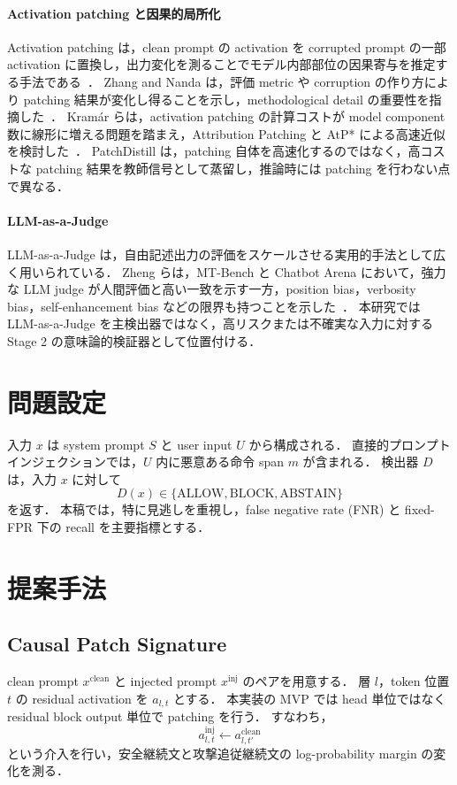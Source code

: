 \documentclass[11pt,a4paper]{ltjsarticle}
\begin{document}
\paragraph{Activation patching と因果的局所化}
Activation patching は，clean prompt の activation を corrupted prompt の一部 activation に置換し，出力変化を測ることでモデル内部部位の因果寄与を推定する手法である~\cite{zhang2024activationpatching}．
Zhang and Nanda は，評価 metric や corruption の作り方により patching 結果が変化し得ることを示し，methodological detail の重要性を指摘した~\cite{zhang2024activationpatching}．
Kramár らは，activation patching の計算コストが model component 数に線形に増える問題を踏まえ，Attribution Patching と AtP* による高速近似を検討した~\cite{kramar2024atpstar}．
PatchDistill は，patching 自体を高速化するのではなく，高コストな patching 結果を教師信号として蒸留し，推論時には patching を行わない点で異なる．

\paragraph{LLM-as-a-Judge}
LLM-as-a-Judge は，自由記述出力の評価をスケールさせる実用的手法として広く用いられている．
Zheng らは，MT-Bench と Chatbot Arena において，強力な LLM judge が人間評価と高い一致を示す一方，position bias，verbosity bias，self-enhancement bias などの限界も持つことを示した~\cite{zheng2023judging}．
本研究では LLM-as-a-Judge を主検出器ではなく，高リスクまたは不確実な入力に対する Stage 2 の意味論的検証器として位置付ける．

\section{問題設定}
入力 $x$ は system prompt $S$ と user input $U$ から構成される．
直接的プロンプトインジェクションでは，$U$ 内に悪意ある命令 span $m$ が含まれる．
検出器 $D$ は，入力 $x$ に対して
\[
D(x) \in \{\mathrm{ALLOW}, \mathrm{BLOCK}, \mathrm{ABSTAIN}\}
\]
を返す．
本稿では，特に見逃しを重視し，false negative rate (FNR) と fixed-FPR 下の recall を主要指標とする．

\section{提案手法}
\subsection{Causal Patch Signature}
clean prompt $x^{\mathrm{clean}}$ と injected prompt $x^{\mathrm{inj}}$ のペアを用意する．
層 $l$，token 位置 $t$ の residual activation を $a_{l,t}$ とする．
本実装の MVP では head 単位ではなく residual block output 単位で patching を行う．
すなわち，
\[
a^{\mathrm{inj}}_{l,t} \leftarrow a^{\mathrm{clean}}_{l,t'}
\]
という介入を行い，安全継続文と攻撃追従継続文の log-probability margin の変化を測る．
\end{document}
